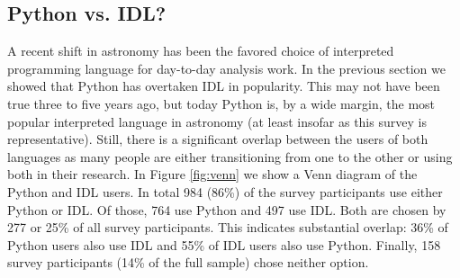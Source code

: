 \subsection{Python vs. IDL?}

A recent shift in astronomy has been the favored choice of interpreted programming language for day-to-day analysis work. In the previous section we showed that Python has overtaken IDL in popularity. This may not have been true three to five years ago, but today Python is, by a wide margin, the most popular interpreted language in astronomy (at least insofar as this survey is representative). Still, there is a significant overlap between the users of both languages as many people are either transitioning from one to the other or using both in their research. In Figure \ref{fig:venn} we show a Venn diagram of the Python and IDL users. In total 984 (86\%) of the survey participants use either Python or IDL. Of those, 764 use Python and 497 use IDL. Both are chosen by 277 or 25\% of all survey participants. This indicates substantial overlap: 36\% of Python users also use IDL and 55\% of IDL users also use Python. Finally, 158 survey participants (14\% of the full sample) chose neither option.

    
  